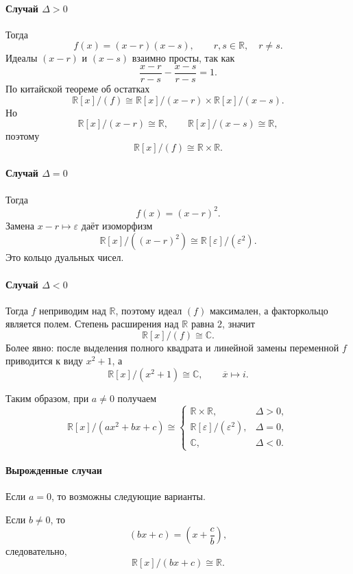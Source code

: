 \documentclass[12pt,a4paper]{article}
\begin{document}
\paragraph{Случай $\Delta>0$}

Тогда
\[
f(x)=(x-r)(x-s),
\qquad r,s\in\mathbb R,\quad r\neq s.
\]
Идеалы $(x-r)$ и $(x-s)$ взаимно просты, так как
\[
\frac{x-r}{r-s}-\frac{x-s}{r-s}=1.
\]
По китайской теореме об остатках
\[
\mathbb R[x]/(f)
\cong
\mathbb R[x]/(x-r)\times \mathbb R[x]/(x-s).
\]
Но
\[
\mathbb R[x]/(x-r)\cong\mathbb R,
\qquad
\mathbb R[x]/(x-s)\cong\mathbb R,
\]
поэтому
\[
\mathbb R[x]/(f)\cong \mathbb R\times\mathbb R.
\]

\paragraph{Случай $\Delta=0$}

Тогда
\[
f(x)=(x-r)^2.
\]
Замена $x-r\mapsto \varepsilon$ даёт изоморфизм
\[
\mathbb R[x]/((x-r)^2)
\cong
\mathbb R[\varepsilon]/(\varepsilon^2).
\]
Это кольцо дуальных чисел.

\paragraph{Случай $\Delta<0$}

Тогда $f$ неприводим над $\mathbb R$, поэтому идеал $(f)$ максимален, а факторкольцо является полем. Степень расширения над $\mathbb R$ равна $2$, значит
\[
\mathbb R[x]/(f)\cong \mathbb C.
\]
Более явно: после выделения полного квадрата и линейной замены переменной $f$ приводится к виду $x^2+1$, а
\[
\mathbb R[x]/(x^2+1)\cong\mathbb C,
\qquad
\overline x\mapsto i.
\]

Таким образом, при $a\neq 0$ получаем
\[
\mathbb R[x]/(ax^2+bx+c)
\cong
\begin{cases}
\mathbb R\times\mathbb R, & \Delta>0,\\[2mm]
\mathbb R[\varepsilon]/(\varepsilon^2), & \Delta=0,\\[2mm]
\mathbb C, & \Delta<0.
\end{cases}
\]

\paragraph{Вырожденные случаи}

Если $a=0$, то возможны следующие варианты.

Если $b\neq 0$, то
\[
(bx+c)=\left(x+\frac cb\right),
\]
следовательно,
\[
\mathbb R[x]/(bx+c)\cong\mathbb R.
\]
\end{document}
